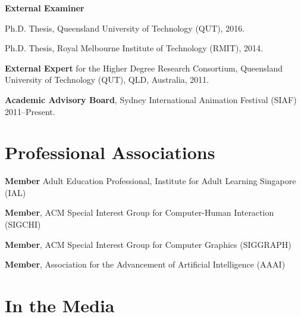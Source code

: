 \documentclass[10pt,a4paper]{article}
\renewenvironment{itemize}{
  \begin{list}{}{
    \setlength{\leftmargin}{1.5em}
    \setlength{\itemsep}{0.25em}
    \setlength{\parskip}{0pt}
    \setlength{\parsep}{0.25em}
  }
}{
  \end{list}
}
\begin{document}
\begin{itemize}
\item \textbf{External Examiner}
\begin{itemize}
    \item Ph.D. Thesis, Queensland University of Technology (QUT), 2016.
    \item Ph.D. Thesis, Royal Melbourne Institute of Technology (RMIT), 2014.
\end{itemize}

\item \textbf{External Expert} for the Higher Degree Research Consortium, Queensland University of Technology (QUT), QLD, Australia, 2011.

\item \textbf{Academic Advisory Board}, Sydney International Animation Festival (SIAF) 2011--Present.

\end{itemize}

\section*{Professional Associations}

\begin{itemize}

    \item \textbf{Member} Adult Education Professional, Institute for Adult Learning Singapore (IAL)

    \item \textbf{Member}, ACM Special Interest Group for Computer-Human Interaction (SIGCHI)

    \item \textbf{Member}, ACM Special Interest Group for Computer Graphics (SIGGRAPH)

    \item \textbf{Member}, Association for the Advancement of Artificial Intelligence (AAAI)

\end{itemize}

\section*{In the Media}
\end{document}
